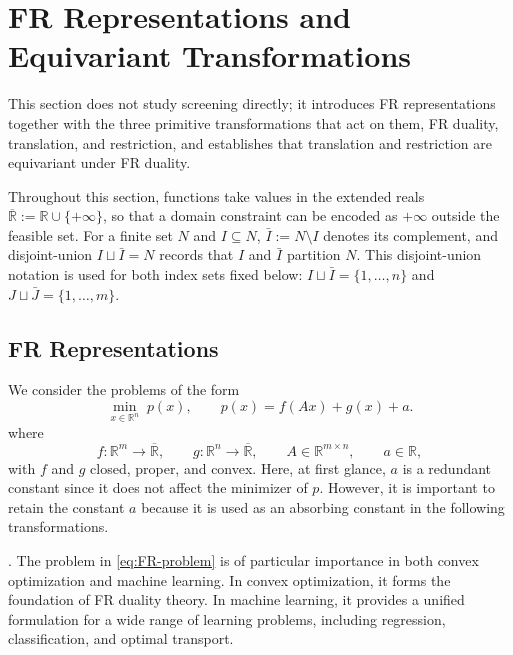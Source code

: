 \section{FR Representations and Equivariant Transformations}
\label{sec:operators}
This section does not study screening directly; it introduces FR representations together with the three primitive transformations that act on them, FR duality, translation, and restriction, and establishes that translation and restriction are equivariant under FR duality.

Throughout this section, functions take values in the extended reals \(\overline{\mathbb R}:=\mathbb R\cup\{+\infty\}\), so that a domain constraint can be encoded as \(+\infty\) outside the feasible set. For a finite set \(N\) and \(I\subseteq N\), \(\bar I:=N\setminus I\) denotes its complement, and  disjoint-union \(I\sqcup\bar I=N\) records that \(I\) and \(\bar I\) partition \(N\). This disjoint-union notation is used for both index sets fixed below: \(I\sqcup\bar I=\{1,\ldots,n\}\) and \(J\sqcup\bar J=\{1,\ldots,m\}\).







\subsection{FR Representations}

We consider the problems of the form
\begin{equation}
\min_{x \in \mathbb R^n}\;
p(x), \qquad p(x) = f(Ax)+g(x)+a.
\label{eq:FR-problem}
\end{equation}
where
\begin{equation}
f:\mathbb R^m\rightarrow\overline{\mathbb R},
\qquad
g:\mathbb R^n\rightarrow\overline{\mathbb R},
\qquad
A\in\mathbb R^{m\times n},
\qquad
a\in\mathbb R,
\label{eq:cond-of-FR-representation}
\end{equation}
with \(f\) and \(g\) closed, proper, and convex.
Here, at first glance, \(a\) is a redundant constant since it does not affect the minimizer of \(p\). However, it is important to retain the constant \(a\) because it is used as an absorbing constant in the following transformations.


.
The problem in \eqref{eq:FR-problem} is of particular importance in both
convex optimization and machine learning. In convex optimization, it
forms the foundation of FR duality theory. In machine learning, it
provides a unified formulation for a wide range of learning problems,
including regression, classification, and optimal transport.


